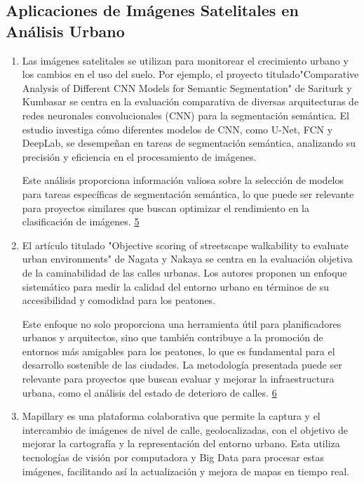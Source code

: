 \documentclass{article}
\begin{document}
\subsection{Aplicaciones de Imágenes Satelitales en Análisis Urbano}
\begin{enumerate}
    \item Las imágenes satelitales se utilizan para monitorear el crecimiento urbano y los cambios en el uso del suelo. Por ejemplo, el proyecto titulado"Comparative Analysis of Different CNN Models for Semantic Segmentation" de Sariturk y Kumbasar se centra en la evaluación comparativa de diversas arquitecturas de redes neuronales convolucionales (CNN) para la segmentación semántica. El estudio investiga cómo diferentes modelos de CNN, como U-Net, FCN y DeepLab, se desempeñan en tareas de segmentación semántica, analizando su precisión y eficiencia en el procesamiento de imágenes.

    Este análisis proporciona información valiosa sobre la selección de modelos para tareas específicas de segmentación semántica, lo que puede ser relevante para proyectos similares que buscan optimizar el rendimiento en la clasificación de imágenes. \href{https://www.semanticscholar.org/paper/Comparative-Analysis-of-Different-CNN-Models-for-Sariturk-Kumbasar/d8400a08b6e0a6bd74ec80e5cfd3295659222b90}{5}
    
    \item El artículo titulado "Objective scoring of streetscape walkability to evaluate urban environments" de Nagata y Nakaya se centra en la evaluación objetiva de la caminabilidad de las calles urbanas. Los autores proponen un enfoque sistemático para medir la calidad del entorno urbano en términos de su accesibilidad y comodidad para los peatones.

    Este enfoque no solo proporciona una herramienta útil para planificadores urbanos y arquitectos, sino que también contribuye a la promoción de entornos más amigables para los peatones, lo que es fundamental para el desarrollo sostenible de las ciudades. La metodología presentada puede ser relevante para proyectos que buscan evaluar y mejorar la infraestructura urbana, como el análisis del estado de deterioro de calles. \href{https://www.semanticscholar.org/paper/Objective-scoring-of-streetscape-walkability-to-of-Nagata-Nakaya/3ab9cb125263f3aee87237be3fc037f916e38275}{6}
    
    \item Mapillary es una plataforma colaborativa que permite la captura y el intercambio de imágenes de nivel de calle, geolocalizadas, con el objetivo de mejorar la cartografía y la representación del entorno urbano. Esta utiliza tecnologías de visión por computadora y Big Data para procesar estas imágenes, facilitando así la actualización y mejora de mapas en tiempo real.
    

\end{enumerate}
\end{document}
